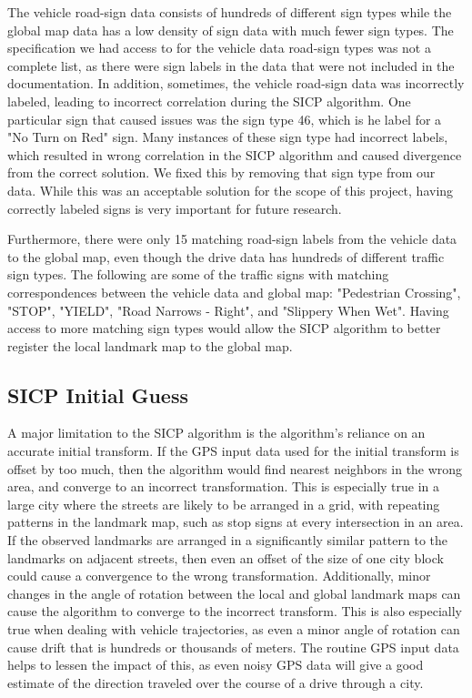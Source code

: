 \documentclass[letterpaper, 10 pt, conference]{ieeeconf}  %
\begin{document}
The vehicle road-sign data consists of hundreds of different sign types while the global map data has a low density of sign data with much fewer sign types. The specification we had access to for the vehicle data road-sign types was not a complete list, as there were sign labels in the data that were not included in the documentation. In addition, sometimes, the vehicle road-sign data was incorrectly labeled, leading to incorrect correlation during the SICP algorithm. One particular sign that caused issues was the sign type 46, which is he label for a "No Turn on Red" sign. Many instances of these sign type had incorrect labels, which resulted in wrong correlation in the SICP algorithm and caused divergence from the correct solution. We fixed this by removing that sign type from our data. While this was an acceptable solution for the scope of this project, having correctly labeled signs is very important for future research.

Furthermore, there were only 15 matching road-sign labels from the vehicle data to the global map, even though the drive data has hundreds of different traffic sign types. The following are some of the traffic signs with matching correspondences between the vehicle data and global map: "Pedestrian Crossing", "STOP", "YIELD", "Road Narrows - Right", and "Slippery When Wet". Having access to more matching sign types would allow the SICP algorithm to better register the local landmark map to the global map.

\subsection{SICP Initial Guess}

A major limitation to the SICP algorithm is the algorithm's reliance on an accurate initial transform. If the GPS input data used for the initial transform is offset by too much, then the algorithm would find nearest neighbors in the wrong area, and converge to an incorrect transformation. This is especially true in a large city where the streets are likely to be arranged in a grid, with repeating patterns in the landmark map, such as stop signs at every intersection in an area. If the observed landmarks are arranged in a significantly similar pattern to the landmarks on adjacent streets, then even an offset of the size of one city block could cause a convergence to the wrong transformation. Additionally, minor changes in the angle of rotation between the local and global landmark maps can cause the algorithm to converge to the incorrect transform. This is also especially true when dealing with vehicle trajectories, as even a minor angle of rotation can cause drift that is hundreds or thousands of meters. The routine GPS input data helps to lessen the impact of this, as even noisy GPS data will give a good estimate of the direction traveled over the course of a drive through a city. 
\end{document}
